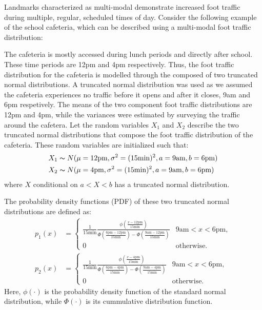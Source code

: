 \documentclass[conference]{ieeeconf}
\begin{document}
Landmarks characterized as multi-modal demonstrate increased foot traffic during multiple, regular, scheduled times of day. Consider the following example of the school cafeteria, which can be described using a multi-modal foot traffic distribution: 

The cafeteria is mostly accessed during lunch periods and directly after school. These time periods are 12pm and 4pm respectively. Thus, the foot traffic distribution for the cafeteria is modelled through the composed of two truncated normal distributions. A truncated normal distribution was used as we assumed the cafeteria experiences no traffic before it opens and after it closes, 9am and 6pm respetively. The means of the two component foot traffic distributions are 12pm and 4pm, while the variances were estimated by surveying the traffic around the cafetera. Let the random variables $X_1$ and $X_2$ describe the two truncated normal distributions that compose the foot traffic distribution of the cafeteria. These random variables are initialized such that:
\begin{align*}
	X_1 &\thicksim N(\mu=12\text{pm}, \sigma^2=(15\text{min})^2, a=9\text{am}, b=6\text{pm}) \\
	X_2 &\thicksim N(\mu=4\text{pm}, \sigma^2=(15\text{min})^2, a=9\text{am}, b=6\text{pm})
\end{align*}
where $X$ conditional on $a<X<b$ has a truncated normal distribution. 

The probability density functions (PDF) of these two truncated normal distributions are defined as:
\begin{align*}
	p_1(x) &= \begin{cases}
			\frac{1}{15\text{min}}\frac{\phi(\frac{x-12\text{pm}}{15\text{min}})}{\Phi(\frac{6\text{pm}-12\text{pm}}{15\text{min}}) - \Phi(\frac{9\text{am}-12\text{pm}}{15\text{min}})} & 9\text{am}<x<6\text{pm},\\
			0 & \text{otherwise}.
			\end{cases} \\
	p_2(x) &= \begin{cases} 
			\frac{1}{15\text{min}}\frac{\phi(\frac{x-4\text{pm}}{15\text{min}})}{\Phi(\frac{6\text{pm}-4\text{pm}}{15\text{min}}) - \Phi(\frac{9\text{am}-4\text{pm}}{15\text{min}})} & 9\text{am}<x<6\text{pm},\\
			0 & \text{otherwise}.
			\end{cases}
\end{align*}
Here, $\phi(\cdot)$ is the probability density function of the standard normal distribution, while $\Phi(\cdot)$ is its cummulative distribution function.
\end{document}
